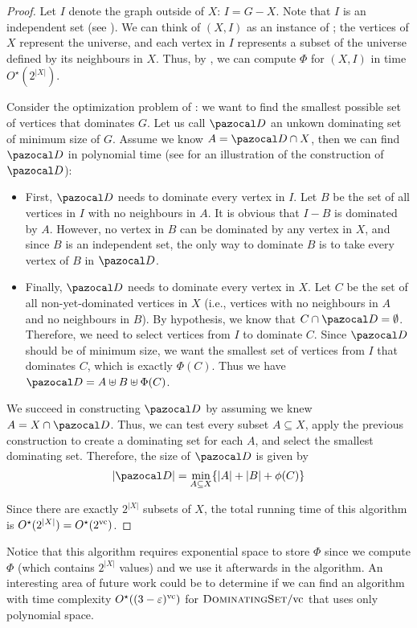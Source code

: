 \begin{proof}
    Let $I$ denote the graph outside of $X$: $I = G - X$. Note that $I$ is an independent set (see ). We can think of $(X, I)$ as an instance of ; the vertices of $X$ represent the universe, and each vertex in $I$ represents a subset of the universe defined by its neighbours in $X$. Thus, by , we can compute $\Phi$ for $(X, I)$ in time $O^\star(2^{|X|})$.

    \medskip
    
    Consider the optimization problem of : we want to find the smallest possible set of vertices that dominates $G$. Let us call $\D$ an unkown dominating set of minimum size of $G$. Assume we know $A = \D \cap X$, then we can find $\D$ in polynomial time (see  for an illustration of the construction of $\D$):
    \begin{itemize}
        \item First, $\D$ needs to dominate every vertex in $I$. Let $B$ be the set of all vertices in $I$ with no neighbours in $A$. It is obvious that $I - B$ is dominated by $A$. However, no vertex in $B$ can be dominated by any vertex in $X$, and since $B$ is an independent set, the only way to dominate $B$ is to take every vertex of $B$ in $\D$.
        \item Finally, $\D$ needs to dominate every vertex in $X$. Let $C$ be the set of all non-yet-dominated vertices in $X$ (i.e., vertices with no neighbours in $A$ and no neighbours in $B$). By hypothesis, we know that $C \cap \D = \emptyset$. Therefore, we need to select vertices from $I$ to dominate $C$. Since $\D$ should be of minimum size, we want the smallest set of vertices from $I$ that dominates $C$, which is exactly $\Phi(C)$. Thus we have $\D = A \uplus B \uplus \Phi(C)$.
    \end{itemize}
    
    \medskip

    We succeed in constructing $\D$ by assuming we knew $A = X \cap \D$. Thus, we can test every subset $A \subseteq X$, apply the previous construction to create a dominating set for each $A$, and select the smallest dominating set. Therefore, the size of $\D$ is given by
    $$|\D| = \min_{A \subseteq X}\{|A| + |B| + \phi(C)\}$$

    Since there are exactly $2^{|X|}$ subsets of $X$, the total running time of this algorithm is $O^\star(2^{|X|}) = O^\star(2^{\text{vc}})$.
\end{proof}

Notice that this algorithm requires exponential space to store $\Phi$ since we compute $\Phi$ (which contains $2^{|X|}$ values) and we use it afterwards in the algorithm. An interesting area of future work could be to determine if we can find an algorithm with time complexity $O^\star((3 - \varepsilon)^{\text{vc}})$ for $\textsc{DominatingSet}/\text{vc}$ that uses only polynomial space.
